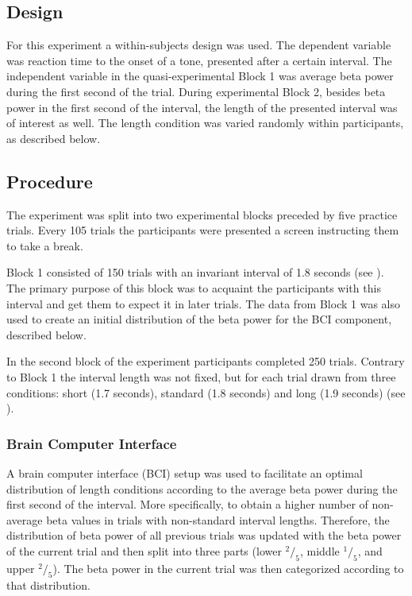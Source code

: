 \documentclass[man,floatsintext]{apa6} %
\begin{document}
\subsection{Design}
For this experiment a within-subjects design was used. The dependent
variable was reaction time to the onset of a tone, presented after a
certain interval. The independent variable in the quasi-experimental
Block 1 was average beta power during the first second of the
trial. During experimental Block 2, besides beta power in the first
second of the interval, the length of the presented interval was of
interest as well. The length condition was varied randomly within
participants, as described below.

\subsection{Procedure}
The experiment was split into two experimental blocks preceded by five
practice trials. Every 105 trials the participants were presented a
screen instructing them to take a break.

Block 1 consisted of 150 trials with an invariant interval of 1.8
seconds (see ). The primary purpose of this block was
to acquaint the participants with this interval and get them to expect
it in later trials. The data from Block 1 was also used to create an
initial distribution of the beta power for the BCI component,
described below.

In the second block of the experiment participants completed 250
trials. Contrary to Block 1 the interval length was not fixed, but for
each trial drawn from three conditions: short (1.7 seconds), standard
(1.8 seconds) and long (1.9 seconds) (see ).

\subsubsection{Brain Computer Interface}
A brain computer interface (BCI) setup was used to facilitate an
optimal distribution of length conditions according to the average
beta power during the first second of the interval. More specifically,
to obtain a higher number of non-average beta values in trials with
non-standard interval lengths. Therefore, the distribution of beta
power of all previous trials was updated with the beta power of the
current trial and then split into three parts (lower $^2/_5$,
middle $^1/_5$, and upper $^2/_5$). The beta power in the
current trial was then categorized according to that distribution.
\end{document}
